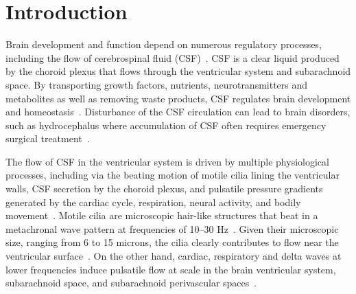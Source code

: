 \documentclass{WileyMSP-template}
\begin{document}




\section{Introduction}

Brain development and function depend on numerous regulatory
processes, including the flow of cerebrospinal fluid
(CSF)~\cite{CITATTION}. CSF is a clear liquid produced by the choroid
plexus that flows through the ventricular system and subarachnoid
space. By transporting growth factors, nutrients, neurotransmitters
and metabolites as well as removing waste products, CSF regulates
brain development and homeostasis~\cite{CITATTION}. Disturbance of the
CSF circulation can lead to brain disorders, such as hydrocephalus
where accumulation of CSF often requires emergency surgical
treatment~\cite{CITATTION}. 

%

The flow of CSF in the ventricular system is driven by multiple
physiological processes, including via the beating motion of motile
cilia lining the ventricular walls, CSF secretion by the choroid
plexus, and pulsatile pressure gradients generated by the cardiac
cycle, respiration, neural activity, and bodily
movement~\cite{CITATION}. Motile cilia are microscopic hair-like
structures that beat in a metachronal wave pattern at frequencies of
10--30 Hz~\cite{CITATION}. Given their microscopic size, ranging from
6 to 15 microns, the cilia clearly contributes to flow near the
ventricular surface~\cite{CITATION}. On the other hand, cardiac,
respiratory and delta waves at lower frequencies induce pulsatile flow
at scale in the brain ventricular system, subarachnoid space, and
subarachnoid perivascular
spaces~\cite{Vinje2019RespiratoryMeasurements, eide2024functional,
  causemann2025insilico, fultz2019coupled}.
\end{document}
